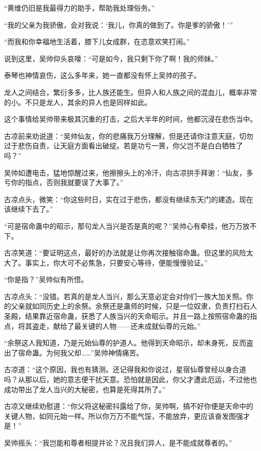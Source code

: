 \begin{this_body}
“黄维仍旧是我最得力的助手，帮助我处理俗务。”

“我的父亲为我骄傲，会对我说：‘我儿，你真的做到了。你是爹的骄傲！’”

“而我和你幸福地生活着，膝下儿女成群，在恣意欢笑打闹。”

说到这里，吴帅仰头哀嚎：“可是如今，我只剩下你了啊！我的师妹。”

泰琴也神情哀伤，这么多年来，她一直都没有怀上吴帅的孩子。

龙人之间结合，繁衍多多，比人族还能生。但异人和人族之间的混血儿，概率非常的小。不只是龙人，其余的异人也是同样如此。

这个事情给吴帅带来极其沉重的打击，之后大半年的时间，他都沉浸在悲伤当中。

古凉前来劝说道：“吴帅仙友，你的悲痛我万分理解，但是还请你注意天庭，切勿过于悲伤自责，让天庭方面看出破绽。若是功亏一篑，你父岂不是白白牺牲了吗？”

吴帅如遭电击，猛地惊醒过来，他擦擦头上的冷汗，向古凉拱手拜谢：“仙友，多亏你的指点，否则我就要误了大事了。”

古凉点头，微笑：“你这些时日，实在过于悲伤，都没有继续东天门的建造。现在该继续下去了。”

“可是宿命蛊中的昭示，那句龙人当兴是否是真的呢？”吴帅心有牵挂，他万万放不下。

古凉笑道：“要证明这点，最好的办法就是让你再次接触宿命蛊。但这里的风险太大了。事实上，你大可不必焦急，只要安心等待，便能慢慢验证。”

“你是指？”吴帅似有所悟。

古凉点头：“没错。若真的是龙人当兴，那么天意必定会对你们一族大加关照。你的父亲就如同历史上的余祭。余祭还是蛊师的时候，只是一位奴隶，负责打扫石人圣殿，结果靠近宿命蛊，获悉了人族当兴的天命昭示。并且一路上按照宿命蛊的指点，将其盗走，献给了最关键的人物——还未成就仙尊的元始。”

“余祭这人我知道，乃是元始仙尊的护道人。他得到天命昭示，却未身死，反而盗出了宿命蛊。为何我父却……”吴帅神情痛苦。

古凉道：“这个原因，我也有猜测。还记得我和你说过，星宿仙尊曾经以身合道吗？从那以后，她的意志便干扰天意。恐怕就是因此，你父才遭此厄运，不过他也成功带出了龙人当兴的大秘密，也算是死得其所了。”

古凉又继续劝慰道：“你父将这秘密抖露给了你，吴帅啊，搞不好你便是天命中的关键人物，如同元始一样。所以你万万不能气馁，不能放弃，更应该奋发图强才是！”

吴帅摇头：“我岂能和尊者相提并论？况且我们异人，是不能成就尊者的。”


\end{this_body}
